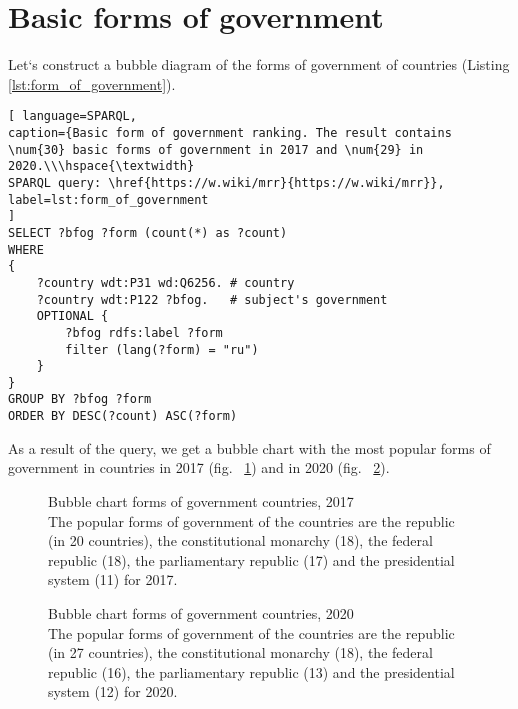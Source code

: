 \section{Basic forms of government}

Let`s construct a bubble diagram of the forms of government of countries (Listing \ref{lst:form_of_government}).
\begin{lstlisting}[ language=SPARQL, 
caption={Basic form of government ranking. The result contains \num{30} basic forms of government in 2017 and \num{29} in 2020.\\\hspace{\textwidth}
SPARQL query: \href{https://w.wiki/mrr}{https://w.wiki/mrr}},
label=lst:form_of_government
]
SELECT ?bfog ?form (count(*) as ?count)
WHERE 
{
	?country wdt:P31 wd:Q6256. # country
	?country wdt:P122 ?bfog.   # subject's government
	OPTIONAL {
		?bfog rdfs:label ?form
		filter (lang(?form) = "ru")
	}
}
GROUP BY ?bfog ?form
ORDER BY DESC(?count) ASC(?form)
\end{lstlisting}


As a result of the query, we get a bubble chart with the most popular forms of government in countries in 2017 (fig. ~\ref{fig:bubble_chart_forms_of_government_countries_2017}) and in 2020 (fig. ~\ref{fig:bubble_chart_forms_of_government_countries_2020}).

\begin{figure}
	{
		\setlength{\fboxsep}{0pt}%
		\setlength{\fboxrule}{1pt}%
	}
	\caption{Bubble chart forms of government countries, 2017
		\\ The popular forms of government of the countries are the republic (in 20 countries), the constitutional monarchy (18), the federal republic (18), the parliamentary republic (17) and the presidential system (11) for 2017.
	}%
	\label{fig:bubble_chart_forms_of_government_countries_2017}%
\end{figure}

\begin{figure}
	{
		\setlength{\fboxsep}{0pt}%
		\setlength{\fboxrule}{1pt}%
	}
	\caption{Bubble chart forms of government countries, 2020
		\\ 
		The popular forms of government of the countries are the republic (in 27 countries), the constitutional monarchy (18), the federal republic (16), the parliamentary republic (13) and the presidential system (12) for 2020.
	}%
	\label{fig:bubble_chart_forms_of_government_countries_2020}%
\end{figure}

